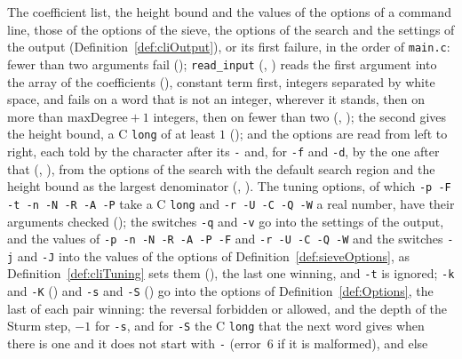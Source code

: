 \begin{definition}\label{def:cliInput}
  \leanok
  The coefficient list, the height bound and the values of the options of a command line, those of
  the options of the sieve, the options of the search and the settings of the output
  (Definition~\ref{def:cliOutput}), or its first failure, in the order of \verb|main.c|: fewer than
  two arguments fail (); \verb|read_input| (,
  ) reads the first argument into the array of the coefficients
  (), constant term first, integers separated by white space, and fails on a
  word that is not an integer, wherever it stands, then on more than $\mathrm{maxDegree} + 1$
  integers, then on fewer than two (, ); the
  second gives the height bound, a C \verb|long| of at least $1$ (); and
  the options are read from left to right, each told by the character after its \verb|-| and, for
  \verb|-f| and \verb|-d|, by the one after that (,
  ), from the options of the search with the default search region and the
  height bound as the largest denominator (, ).
  The tuning options, of which \verb|-p -F -t -n -N -R -A -P| take a C \verb|long| and
  \verb|-r -U -C -Q -W| a real number, have their arguments checked ();
  the switches \verb|-q| and \verb|-v| go into the settings of the output, and the values of
  \verb|-p -n -N -R -A -P -F| and \verb|-r -U -C -Q -W| and the switches \verb|-j| and \verb|-J|
  into the values of the options of Definition~\ref{def:sieveOptions}, as
  Definition~\ref{def:cliTuning} sets them (), the last one winning, and
  \verb|-t| is ignored; \verb|-k| and \verb|-K| () and \verb|-s| and
  \verb|-S| () go into the options of Definition~\ref{def:Options}, the
  last of each pair winning: the reversal forbidden or allowed, and the depth of the Sturm step,
  $-1$ for \verb|-s|, and for \verb|-S| the C \verb|long| that the next word gives when there is one
  and it does not start with \verb|-| (error~6 if it is malformed), and else

\end{definition}
